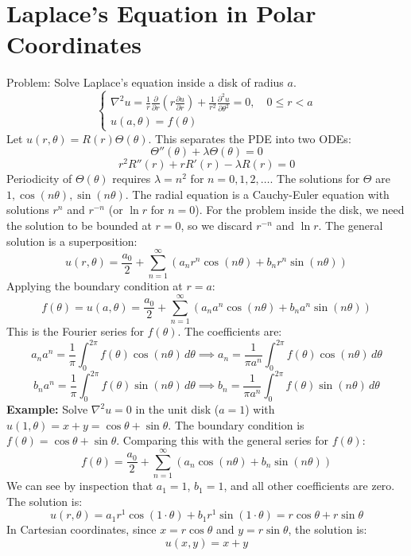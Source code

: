 \documentclass{article}
\begin{document}
	\section{Laplace's Equation in Polar Coordinates}
	
	Problem: Solve Laplace's equation inside a disk of radius $a$.
	$$
	\begin{cases}
		\nabla^2 u = \frac{1}{r}\frac{\partial}{\partial r}\left(r\frac{\partial u}{\partial r}\right) + \frac{1}{r^2}\frac{\partial^2 u}{\partial \theta^2} = 0, \quad 0 \le r < a \\
		u(a, \theta) = f(\theta)
	\end{cases}
	$$
	Let $u(r,\theta) = R(r)\Theta(\theta)$. This separates the PDE into two ODEs:
	$$
	\Theta''(\theta) + \lambda \Theta(\theta) = 0
	$$
	$$
	r^2 R''(r) + r R'(r) - \lambda R(r) = 0
	$$
	Periodicity of $\Theta(\theta)$ requires $\lambda = n^2$ for $n=0, 1, 2, \dots$.
	The solutions for $\Theta$ are $1, \cos(n\theta), \sin(n\theta)$.
	The radial equation is a Cauchy-Euler equation with solutions $r^n$ and $r^{-n}$ (or $\ln r$ for $n=0$).
	For the problem inside the disk, we need the solution to be bounded at $r=0$, so we discard $r^{-n}$ and $\ln r$.
	The general solution is a superposition:
	$$
	u(r,\theta) = \frac{a_0}{2} + \sum_{n=1}^\infty (a_n r^n \cos(n\theta) + b_n r^n \sin(n\theta))
	$$
	Applying the boundary condition at $r=a$:
	$$
	f(\theta) = u(a,\theta) = \frac{a_0}{2} + \sum_{n=1}^\infty (a_n a^n \cos(n\theta) + b_n a^n \sin(n\theta))
	$$
	This is the Fourier series for $f(\theta)$. The coefficients are:
	$$
	a_n a^n = \frac{1}{\pi}\int_0^{2\pi} f(\theta) \cos(n\theta) \,d\theta \implies a_n = \frac{1}{\pi a^n}\int_0^{2\pi} f(\theta) \cos(n\theta) \,d\theta
	$$
	$$
	b_n a^n = \frac{1}{\pi}\int_0^{2\pi} f(\theta) \sin(n\theta) \,d\theta \implies b_n = \frac{1}{\pi a^n}\int_0^{2\pi} f(\theta) \sin(n\theta) \,d\theta
	$$
	\textbf{Example:} Solve $\nabla^2 u = 0$ in the unit disk ($a=1$) with $u(1,\theta) = x+y = \cos\theta + \sin\theta$.
	The boundary condition is $f(\theta) = \cos\theta + \sin\theta$.
	Comparing this with the general series for $f(\theta)$:
	$$
	f(\theta) = \frac{a_0}{2} + \sum_{n=1}^\infty (a_n \cos(n\theta) + b_n \sin(n\theta))
	$$
	We can see by inspection that $a_1=1$, $b_1=1$, and all other coefficients are zero.
	The solution is:
	$$
	u(r,\theta) = a_1 r^1 \cos(1\cdot\theta) + b_1 r^1 \sin(1\cdot\theta) = r\cos\theta + r\sin\theta
	$$
	In Cartesian coordinates, since $x = r\cos\theta$ and $y=r\sin\theta$, the solution is:
	$$
	u(x,y) = x+y
	$$
	
\end{document}
